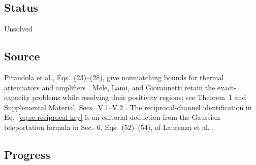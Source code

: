 \subsection*{Status}

Unsolved

\subsection*{Source}

Pirandola et al., Eqs.~(23)--(28), give nonmatching bounds for thermal attenuators and amplifiers . Mele, Lami, and Giovannetti retain the exact-capacity problems while resolving their positivity regions; see Theorem~1 and Supplemental Material, Secs.~V.1--V.2 . The reciprocal-channel identification in Eq.~\eqref{eq:sc-reciprocal-key} is an editorial deduction from the Gaussian teleportation formula in Sec.~6, Eqs.~(52)--(54), of Laurenza et al. .

\subsection*{Progress}

